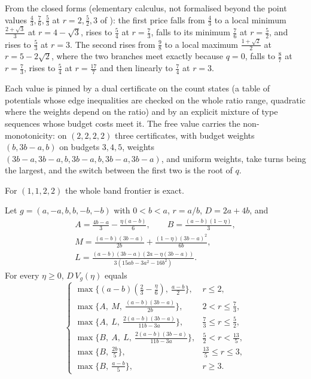 From the closed forms (elementary calculus, not formalised beyond the point values
$\frac43,\frac76,\frac53$ at $r=2,\frac52,3$ of ): the first price falls from
$\frac43$ to a local minimum $\frac{2+\sqrt3}3$ at $r=4-\sqrt3$, rises to $\frac54$ at $r=\frac73$, falls to
its minimum $\frac76$ at $r=\frac52$, and rises to $\frac53$ at $r=3$. The second rises from $\frac98$ to
a local maximum $\frac{1+\sqrt2}2$ at $r=5-2\sqrt2$, where the two branches meet exactly because
$q=0$, falls to $\frac87$ at $r=\frac73$, rises to $\frac54$ at $r=\frac{17}7$ and then linearly to
$\frac74$ at $r=3$.

Each value is pinned by a dual certificate on the count states (a table of potentials whose edge
inequalities are checked on the whole ratio range, quadratic where the weights depend on the
ratio) and by an explicit mixture of type sequences whose budget costs meet it. The free value
carries the non-monotonicity: on $(2,2,2,2)$ three certificates, with budget weights
$(b,3b-a,b)$ on budgets $3,4,5$, weights $(3b-a,3b-a,b,3b-a,b,3b-a,3b-a)$, and uniform weights,
take turns being the largest, and the switch between the first two is the root of $q$.

For $(1,1,2,2)$ the whole band frontier is exact.

\begin{theorem}
\label{thm:twomag1122}
Let $g=(a,-a,b,b,-b,-b)$ with $0<b<a$, $r=a/b$, $D=2a+4b$, and
\[
\begin{gathered}
A=\tfrac{4b-a}3-\tfrac{\eta(a-b)}6,\qquad B=\tfrac{(a-b)(1-\eta)}3,\\
M=\tfrac{(a-b)(3b-a)}{2b}+\tfrac{(1-\eta)(3b-a)^2}{6b},\\
L=\tfrac{(a-b)(3b-a)(2a-\eta(3b-a))}{3(15ab-3a^2-16b^2)}.
\end{gathered}
\]
For every $\eta\ge0$, $D\,V_g(\eta)$ equals
\[
\begin{cases}
\max\{(a-b)(\frac23-\frac\eta6),\ \frac{a-b}2\}, & r\le2,\\[2pt]
\max\{A,\ M,\ \frac{(a-b)(3b-a)}{2b}\}, & 2<r\le\frac73,\\[2pt]
\max\{A,\ L,\ \frac{2(a-b)(3b-a)}{11b-3a}\}, & \frac73\le r\le\frac52,\\[2pt]
\max\{B,\ A,\ L,\ \frac{2(a-b)(3b-a)}{11b-3a}\}, & \frac52<r<\frac{13}5,\\[2pt]
\max\{B,\ \frac{2b}5\}, & \frac{13}5\le r\le3,\\[2pt]
\max\{B,\ \frac{a-b}5\}, & r\ge3.
\end{cases}
\]
\end{theorem}

